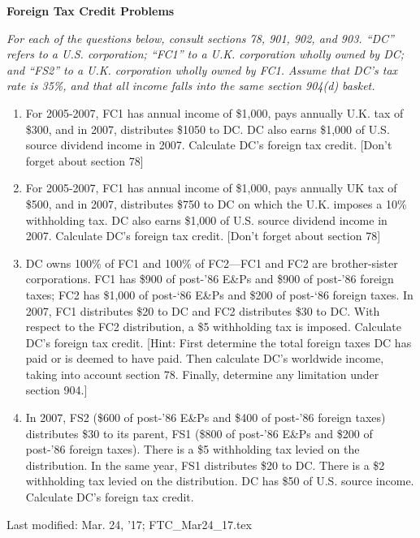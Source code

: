 	\begin{center}
		\textbf{Foreign Tax Credit Problems}
	\end{center}
	\begin{select}
	
\emph{For each of the questions below, consult sections 78, 901, 902, and 903.  ``DC'' refers to a U.S. corporation; ``FC1'' to a U.K. corporation wholly owned by DC; and  ``FS2'' to a U.K. corporation wholly owned by FC1.  Assume that DC's tax rate is 35\%, and that all income falls into the same section 904(d) basket.}  

	\begin{enumerate}
	
	\item For 2005-2007, FC1 has annual income of \$1,000, pays annually U.K. tax of \$300, and in 2007, distributes \$1050 to DC.  DC also earns \$1,000 of U.S. source dividend income in 2007.  Calculate DC's foreign tax credit. [Don't forget about section 78]    
	
	\item For 2005-2007, FC1 has annual income of \$1,000, pays annually UK tax of \$500, and in 2007, distributes \$750 to DC on which the U.K. imposes a 10\% withholding tax.  DC also earns \$1,000 of U.S. source dividend income in 2007.  Calculate DC's foreign tax credit. [Don't forget about section 78] 
	
	\item DC owns 100\% of FC1 and 100\% of FC2---FC1 and FC2 are brother-sister corporations.  FC1 has \$900 of post-'86 E\&Ps and \$900 of post-'86 foreign taxes; FC2 has \$1,000 of post-`86 E\&Ps and \$200 of post-`86 foreign taxes.  In 2007, FC1 distributes \$20 to DC and FC2 distributes \$30 to DC.  With respect to the FC2 distribution, a \$5 withholding tax is imposed.  Calculate DC's foreign tax credit.  [Hint: First determine the total foreign taxes DC has paid or is deemed to have paid.  Then calculate DC's worldwide income, taking into account section 78.  Finally, determine any limitation under section 904.]
	 
	\item In 2007, FS2 (\$600 of post-'86 E\&Ps and \$400 of post-'86 foreign taxes) distributes \$30 to its parent, FS1 (\$800 of post-'86 E\&Ps and \$200 of post-'86 foreign taxes).  There is a \$5 withholding tax levied on the distribution.  In the same year, FS1 distributes \$20 to DC.  There is a \$2 withholding tax levied on the distribution.  DC has \$50 of U.S. source income.  Calculate DC's foreign tax credit. 
	
	\end{enumerate}
\end{select}

 \begin{framed}
 Last modified: Mar. 24, '17; FTC\_Mar24\_17.tex
 \end{framed}
	
